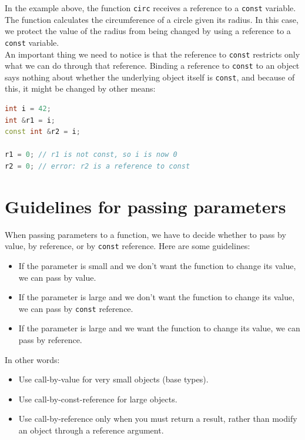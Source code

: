 In the example above, the function \texttt{circ} receives a reference to a
\texttt{const} variable. The function calculates the circumference of a circle
given its radius. In this case, we protect the value of the radius from being
changed by using a reference to a \texttt{const} variable.\\

An important thing we need to notice is that the reference to \texttt{const}
restricts only what we can do through that reference. Binding a reference to
\texttt{const} to an object says nothing about whether the underlying object 
itself is \texttt{const}, and because of this, it might be changed by other means:\\

\begin{lstlisting}[language=C++]
int i = 42;
int &r1 = i;
const int &r2 = i;

r1 = 0; // r1 is not const, so i is now 0
r2 = 0; // error: r2 is a reference to const
\end{lstlisting}

\section{Guidelines for passing parameters}

When passing parameters to a function, we have to decide whether to pass by
value, by reference, or by \texttt{const} reference. Here are some guidelines:

\begin{itemize}
    \item If the parameter is small and we don't want the function to change its
    value, we can pass by value.
    \item If the parameter is large and we don't want the function to change its
    value, we can pass by \texttt{const} reference.
    \item If the parameter is large and we want the function to change its value,
    we can pass by reference.
\end{itemize}

In other words:

\begin{itemize}
    \item Use call-by-value for very small objects (base types).
    \item Use call-by-const-reference for large objects.
    \item Use call-by-reference only when you must return a result,
    rather than modify an object through a reference argument.
\end{itemize}

